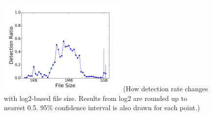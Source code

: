 \begin{figure}[t!]
\begin{center}
\includegraphics[width=2.5in]{figure/size}
  {\footnotesize{(How detection rate changes with log2-based file size.
Results from log2 are rounded up to nearest 0.5.
95\% confidence interval is also drawn for each point.)}}
\end{center}
\end{figure}